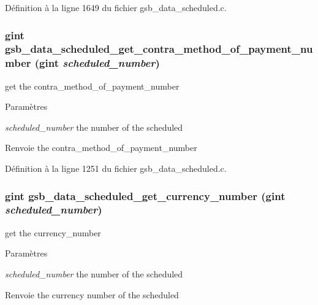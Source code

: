 Définition à la ligne 1649 du fichier gsb\_\-data\_\-scheduled.c.

\subsubsection[{gsb\_\-data\_\-scheduled\_\-get\_\-contra\_\-method\_\-of\_\-payment\_\-number}]{\setlength{\rightskip}{0pt plus 5cm}gint gsb\_\-data\_\-scheduled\_\-get\_\-contra\_\-method\_\-of\_\-payment\_\-number (gint {\em scheduled\_\-number})}\label{gsb__data__scheduled_8h_aa695866444c64f390288fbea3f76de98}
get the contra\_\-method\_\-of\_\-payment\_\-number


\begin{DoxyParams}{Paramètres}
\item[{\em scheduled\_\-number}]the number of the scheduled\end{DoxyParams}
\begin{DoxyReturn}{Renvoie}
the contra\_\-method\_\-of\_\-payment\_\-number 
\end{DoxyReturn}


Définition à la ligne 1251 du fichier gsb\_\-data\_\-scheduled.c.

\subsubsection[{gsb\_\-data\_\-scheduled\_\-get\_\-currency\_\-number}]{\setlength{\rightskip}{0pt plus 5cm}gint gsb\_\-data\_\-scheduled\_\-get\_\-currency\_\-number (gint {\em scheduled\_\-number})}\label{gsb__data__scheduled_8h_ae2e1360e9ff4b1ba96bb241cbe55db25}
get the currency\_\-number


\begin{DoxyParams}{Paramètres}
\item[{\em scheduled\_\-number}]the number of the scheduled\end{DoxyParams}
\begin{DoxyReturn}{Renvoie}
the currency number of the scheduled 
\end{DoxyReturn}



